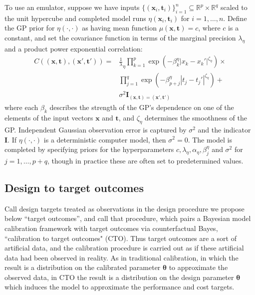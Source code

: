 \documentclass[twocolumn,10pt]{asme2ej}
\begin{document}
%
To use an emulator, suppose we have inputs $\{(\mathbf x_i,\mathbf t_i)\}_{i=1}^n\subseteq \mathbb R^p\times \mathbb R^q$ scaled to the 
unit hypercube and completed model runs 
%
$\eta\left(\mathbf x_i,\mathbf t_i\right)$ for $i=1,\ldots,n.$
%
Define the GP prior for $\eta(\cdot,\cdot)$ as having mean function $\mu(\mathbf x,\mathbf t)=c$, where $c$ is a constant, and
%
set the covariance function in terms of the marginal precision $\lambda_\eta$ and a product power exponential correlation:
% 
\begin{equation}\label{eq:Hig_cov}
\begin{split}
C((\mathbf x,\mathbf t),(\mathbf x',\mathbf t')) = &\frac 1\lambda_\eta \prod_{k=1}^{p}
\exp \left(-\beta^\eta_k|x_k-x_k'|^{\zeta_\eta}\right) \times\\
& \prod_{j=1}^{q}
\exp \left(-\beta^\eta_{p+j}|t_j-t_j'|^{\zeta_\eta}\right) +\\
&\sigma^2 \mathbf I_{(\mathbf x,\mathbf t)=(\mathbf x',\mathbf t')}
\end{split}
\end{equation}
%
where each $\beta_k$ describes the strength of the GP's dependence on one of the elements of the input vectors $\mathbf x$ and $\mathbf t$, and $\zeta_\eta$ determines the smoothness of the GP. 
%
Independent Gaussian observation error is captured by $\sigma^2$ and the indicator $\mathbf I$.
%
If $\eta(\cdot,\cdot)$ is a deterministic computer model, then $\sigma^2=0$.
%
The model is completed by specifying priors for the hyperparameters $c,\lambda_\eta,\alpha_\eta,\beta^\eta_j$ and $\sigma^2$ for $j=1,\ldots,p+q$, though in practice these are often set to predetermined values.
%

%
\subsection{Design to target outcomes}
%

%
Call design targets treated as observations in the design procedure we propose below ``target outcomes'', and call that procedure, which pairs a Bayesian model calibration framework with target outcomes via counterfactual Bayes, ``calibration to target outcomes" (CTO). 
%
Thus target outcomes are a sort of artificial data, and the calibration procedure is carried out as if these artificial data had been observed in reality.
%
As in traditional calibration, in which the result is a distribution on the calibrated parameter $\boldsymbol\theta$ to approximate the observed data, in CTO the result is a distribution on the design parameter $\boldsymbol\theta$ which induces the model to approximate the performance and cost targets.
%
%
%
%
%
\end{document}

